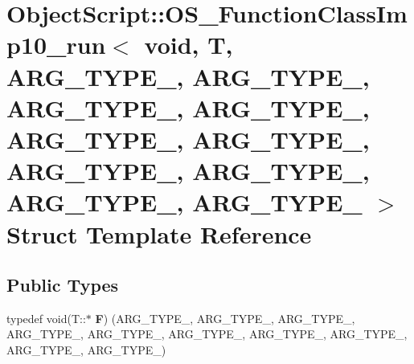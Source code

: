 \hypertarget{struct_object_script_1_1_o_s___function_class_imp10__run_3_01void_00_01_t_00_01_01_01_a_r_g___t_457cbbca4fb8695635ed4d7028248ff9}{}\section{Object\+Script\+:\+:O\+S\+\_\+\+Function\+Class\+Imp10\+\_\+run$<$ void, T, A\+R\+G\+\_\+\+T\+Y\+P\+E\+\_, A\+R\+G\+\_\+\+T\+Y\+P\+E\+\_, A\+R\+G\+\_\+\+T\+Y\+P\+E\+\_, A\+R\+G\+\_\+\+T\+Y\+P\+E\+\_, A\+R\+G\+\_\+\+T\+Y\+P\+E\+\_, A\+R\+G\+\_\+\+T\+Y\+P\+E\+\_, A\+R\+G\+\_\+\+T\+Y\+P\+E\+\_, A\+R\+G\+\_\+\+T\+Y\+P\+E\+\_, A\+R\+G\+\_\+\+T\+Y\+P\+E\+\_, A\+R\+G\+\_\+\+T\+Y\+P\+E\+\_ $>$ Struct Template Reference}
\label{struct_object_script_1_1_o_s___function_class_imp10__run_3_01void_00_01_t_00_01_01_01_a_r_g___t_457cbbca4fb8695635ed4d7028248ff9}
\subsection*{Public Types}
\begin{DoxyCompactItemize}
\item 
typedef void(T\+::$\ast$ {\bfseries F}) (A\+R\+G\+\_\+\+T\+Y\+P\+E\+\_, A\+R\+G\+\_\+\+T\+Y\+P\+E\+\_, A\+R\+G\+\_\+\+T\+Y\+P\+E\+\_, A\+R\+G\+\_\+\+T\+Y\+P\+E\+\_, A\+R\+G\+\_\+\+T\+Y\+P\+E\+\_, A\+R\+G\+\_\+\+T\+Y\+P\+E\+\_, A\+R\+G\+\_\+\+T\+Y\+P\+E\+\_, A\+R\+G\+\_\+\+T\+Y\+P\+E\+\_, A\+R\+G\+\_\+\+T\+Y\+P\+E\+\_, A\+R\+G\+\_\+\+T\+Y\+P\+E\+\_)\hypertarget{struct_object_script_1_1_o_s___function_class_imp10__run_3_01void_00_01_t_00_01_01_01_a_r_g___t_457cbbca4fb8695635ed4d7028248ff9_a3fbcb7cb4cb9e10611c70ea3702fe048}{}\label{struct_object_script_1_1_o_s___function_class_imp10__run_3_01void_00_01_t_00_01_01_01_a_r_g___t_457cbbca4fb8695635ed4d7028248ff9_a3fbcb7cb4cb9e10611c70ea3702fe048}

\end{DoxyCompactItemize}
